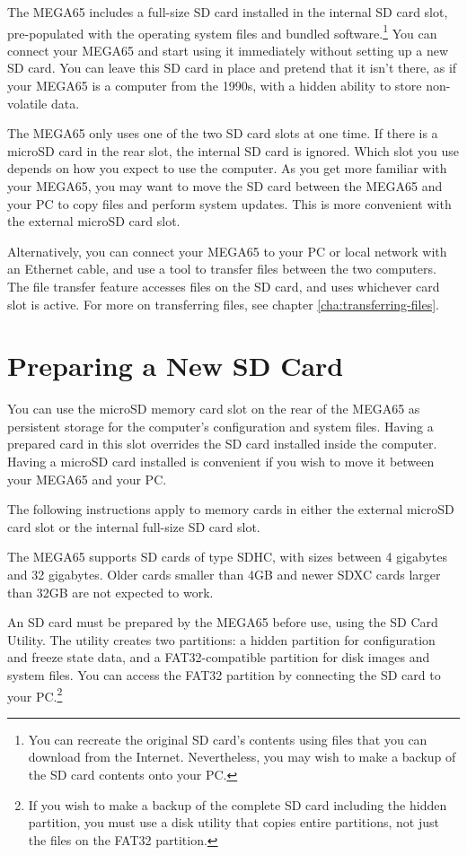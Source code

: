 The MEGA65 includes a full-size SD card installed in the internal SD card slot, pre-populated with the operating system files and bundled software.\footnote{You can recreate the original SD card's contents using files that you can download from the Internet. Nevertheless, you may wish to make a backup of the SD card contents onto your PC.} You can connect your MEGA65 and start using it immediately without setting up a new SD card. You can leave this SD card in place and pretend that it isn't there, as if your MEGA65 is a computer from the 1990s, with a hidden ability to store non-volatile data.

The MEGA65 only uses one of the two SD card slots at one time. If there is a microSD card in the rear slot, the internal SD card is ignored. Which slot you use depends on how you expect to use the computer. As you get more familiar with your MEGA65, you may want to move the SD card between the MEGA65 and your PC to copy files and perform system updates. This is more convenient with the external microSD card slot.

Alternatively, you can connect your MEGA65 to your PC or local network with an Ethernet cable, and use a tool to transfer files between the two computers. The file transfer feature accesses files on the SD card, and uses whichever card slot is active. For more on transferring files, see chapter \vref{cha:transferring-files}.

\section{Preparing a New SD Card}

You can use the microSD memory card slot on the rear of the MEGA65 as persistent storage for the computer's configuration and system files. Having a prepared card in this slot overrides the SD card installed inside the computer. Having a microSD card installed is convenient if you wish to move it between your MEGA65 and your PC.

The following instructions apply to memory cards in either the external microSD card slot or the internal full-size SD card slot.

The MEGA65 supports SD cards of type SDHC, with sizes between 4 gigabytes and 32 gigabytes. Older cards smaller than 4GB and newer SDXC cards larger than 32GB are not expected to work.

An SD card must be prepared by the MEGA65 before use, using the SD Card Utility. The utility creates two partitions: a hidden partition for configuration and freeze state data, and a FAT32-compatible partition for disk images and system files. You can access the FAT32 partition by connecting the SD card to your PC.\footnote{If you wish to make a backup of the complete SD card including the hidden partition, you must use a disk utility that copies entire partitions, not just the files on the FAT32 partition.}

